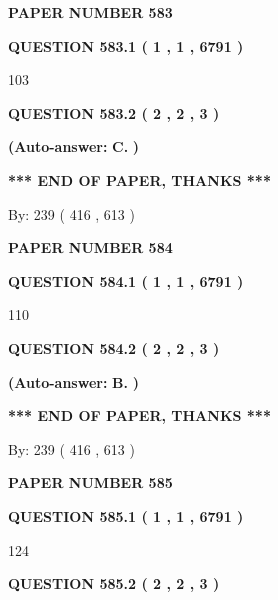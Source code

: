 \documentclass[12pt]{article}
\begin{document}
   
\newpage 
\setcounter{page}{ 
   583001 } 
   
   
 {\textbf{ \Large{ PAPER NUMBER  583  }}}
   
   
   
   
  
  
{\textbf{\large{QUESTION
583.1 
 ( 1 , 1 , 6791 )
}}}

103
  
  
{\textbf{\large{QUESTION
583.2 
 ( 2 , 2 , 3 )
}}}
 
 
{\textbf{(Auto-answer:}}
{\textbf{\large{
C.}}}
{\textbf{)}}
 
 
   
   
   
   
\vspace{1.0in} 
{\textbf{\large{ *** END OF PAPER, THANKS *** }}} 
   
   
\hspace{1.0in} By: 
 239 ( 416 ,  613 )
   
   
   
   
\newpage 
\setcounter{page}{ 
   584001 } 
   
   
 {\textbf{ \Large{ PAPER NUMBER  584  }}}
   
   
   
   
  
  
{\textbf{\large{QUESTION
584.1 
 ( 1 , 1 , 6791 )
}}}

110
  
  
{\textbf{\large{QUESTION
584.2 
 ( 2 , 2 , 3 )
}}}
 
 
{\textbf{(Auto-answer:}}
{\textbf{\large{
B.}}}
{\textbf{)}}
 
 
   
   
   
   
\vspace{1.0in} 
{\textbf{\large{ *** END OF PAPER, THANKS *** }}} 
   
   
\hspace{1.0in} By: 
 239 ( 416 ,  613 )
   
   
   
   
\newpage 
\setcounter{page}{ 
   585001 } 
   
   
 {\textbf{ \Large{ PAPER NUMBER  585  }}}
   
   
   
   
  
  
{\textbf{\large{QUESTION
585.1 
 ( 1 , 1 , 6791 )
}}}

124
  
  
{\textbf{\large{QUESTION
585.2 
 ( 2 , 2 , 3 )
}}}
 
\end{document}
